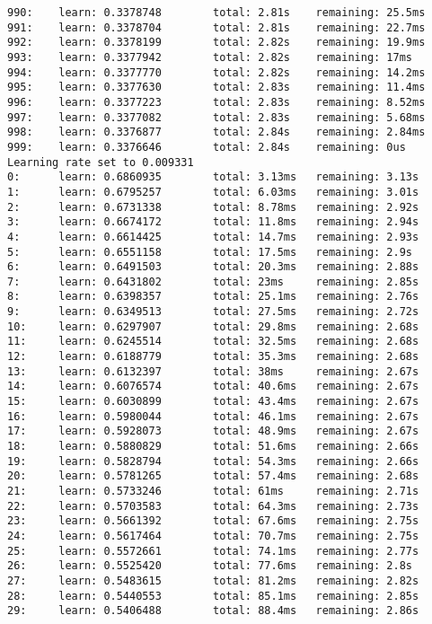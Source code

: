 \documentclass[11pt]{article}
\begin{document}
\begin{Verbatim}[commandchars=\\\{\}]
990:    learn: 0.3378748        total: 2.81s    remaining: 25.5ms
991:    learn: 0.3378704        total: 2.81s    remaining: 22.7ms
992:    learn: 0.3378199        total: 2.82s    remaining: 19.9ms
993:    learn: 0.3377942        total: 2.82s    remaining: 17ms
994:    learn: 0.3377770        total: 2.82s    remaining: 14.2ms
995:    learn: 0.3377630        total: 2.83s    remaining: 11.4ms
996:    learn: 0.3377223        total: 2.83s    remaining: 8.52ms
997:    learn: 0.3377082        total: 2.83s    remaining: 5.68ms
998:    learn: 0.3376877        total: 2.84s    remaining: 2.84ms
999:    learn: 0.3376646        total: 2.84s    remaining: 0us
Learning rate set to 0.009331
0:      learn: 0.6860935        total: 3.13ms   remaining: 3.13s
1:      learn: 0.6795257        total: 6.03ms   remaining: 3.01s
2:      learn: 0.6731338        total: 8.78ms   remaining: 2.92s
3:      learn: 0.6674172        total: 11.8ms   remaining: 2.94s
4:      learn: 0.6614425        total: 14.7ms   remaining: 2.93s
5:      learn: 0.6551158        total: 17.5ms   remaining: 2.9s
6:      learn: 0.6491503        total: 20.3ms   remaining: 2.88s
7:      learn: 0.6431802        total: 23ms     remaining: 2.85s
8:      learn: 0.6398357        total: 25.1ms   remaining: 2.76s
9:      learn: 0.6349513        total: 27.5ms   remaining: 2.72s
10:     learn: 0.6297907        total: 29.8ms   remaining: 2.68s
11:     learn: 0.6245514        total: 32.5ms   remaining: 2.68s
12:     learn: 0.6188779        total: 35.3ms   remaining: 2.68s
13:     learn: 0.6132397        total: 38ms     remaining: 2.67s
14:     learn: 0.6076574        total: 40.6ms   remaining: 2.67s
15:     learn: 0.6030899        total: 43.4ms   remaining: 2.67s
16:     learn: 0.5980044        total: 46.1ms   remaining: 2.67s
17:     learn: 0.5928073        total: 48.9ms   remaining: 2.67s
18:     learn: 0.5880829        total: 51.6ms   remaining: 2.66s
19:     learn: 0.5828794        total: 54.3ms   remaining: 2.66s
20:     learn: 0.5781265        total: 57.4ms   remaining: 2.68s
21:     learn: 0.5733246        total: 61ms     remaining: 2.71s
22:     learn: 0.5703583        total: 64.3ms   remaining: 2.73s
23:     learn: 0.5661392        total: 67.6ms   remaining: 2.75s
24:     learn: 0.5617464        total: 70.7ms   remaining: 2.75s
25:     learn: 0.5572661        total: 74.1ms   remaining: 2.77s
26:     learn: 0.5525420        total: 77.6ms   remaining: 2.8s
27:     learn: 0.5483615        total: 81.2ms   remaining: 2.82s
28:     learn: 0.5440553        total: 85.1ms   remaining: 2.85s
29:     learn: 0.5406488        total: 88.4ms   remaining: 2.86s

\end{Verbatim}
\end{document}
